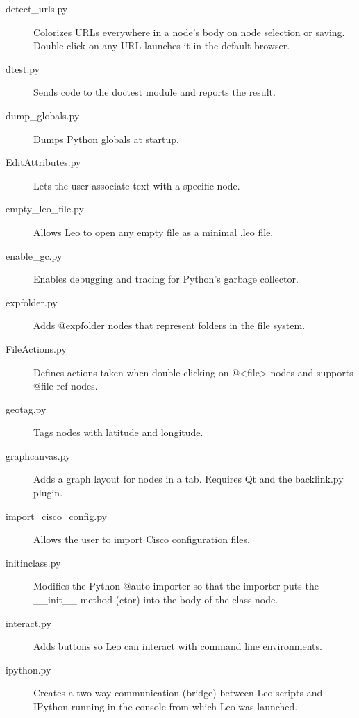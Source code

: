 \documentclass[a4paper,10pt,english]{sphinxmanual}
\begin{document}
\begin{description}
\item[{detect\_urls.py}] \leavevmode
Colorizes URLs everywhere in a node's body on node selection or saving. Double
click on any URL launches it in the default browser.

\item[{dtest.py}] \leavevmode
Sends code to the doctest module and reports the result.

\item[{dump\_globals.py}] \leavevmode
Dumps Python globals at startup.

\item[{EditAttributes.py}] \leavevmode
Lets the user associate text with a specific node.

\item[{empty\_leo\_file.py}] \leavevmode
Allows Leo to open any empty file as a minimal .leo file.

\item[{enable\_gc.py}] \leavevmode
Enables debugging and tracing for Python's garbage collector.

\item[{expfolder.py}] \leavevmode
Adds @expfolder nodes that represent folders in the file system.

\item[{FileActions.py}] \leavevmode
Defines actions taken when double-clicking on @\textless{}file\textgreater{} nodes and supports
@file-ref nodes.

\item[{geotag.py}] \leavevmode
Tags nodes with latitude and longitude.

\item[{graphcanvas.py}] \leavevmode
Adds a graph layout for nodes in a tab.
Requires Qt and the backlink.py plugin.

\item[{import\_cisco\_config.py}] \leavevmode
Allows the user to import Cisco configuration files.

\item[{initinclass.py}] \leavevmode
Modifies the Python @auto importer so that the importer
puts the \_\_init\_\_ method (ctor) into the body of the class node.

\item[{interact.py}] \leavevmode
Adds buttons so Leo can interact with command line environments.

\item[{ipython.py}] \leavevmode
Creates a two-way communication (bridge) between Leo
scripts and IPython running in the console from which Leo was launched.


\end{description}
\end{document}
